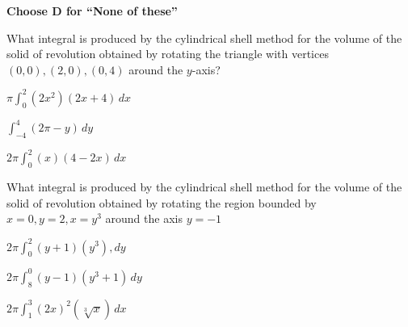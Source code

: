 \documentclass[12pt]{exam}
\newcommand{\<}{(}
\renewcommand{\>}{)}
\begin{document}
\begin{center}
\end{center}
\vspace{0.1in}

\vspace{12pt}

\textbf{Choose D for ``None of these''}

\begin{questions}\setcounter{question}{13}

\question
What integral is produced by the cylindrical shell method for the
volume of the solid of revolution obtained by rotating
the triangle with vertices \((0,0),(2,0),(0,4)\) around the
\(y\)-axis?
\begin{choices}
\item \(\pi\int_0^2(2x^2)(2x+4)\,dx\)
\item \(\int_{-4}^4(2\pi-y)\,dy\)
\item \(2\pi\int_0^2(x)(4-2x)\,dx\)
\end{choices}

\question
What integral is produced by the cylindrical shell method for the
volume of the solid of revolution obtained by rotating
the region bounded by \(x=0,y=2,x=y^3\) around the axis \(y=-1\)
\begin{choices}
\item \(2\pi\int_0^2(y+1)(y^3),dy\)
\item \(2\pi\int_8^0(y-1)(y^3+1)\,dy\)
\item \(2\pi\int_1^3(2x)^2(\sqrt[3]x)\,dx\)
\end{choices}




\end{questions}
\end{document}
